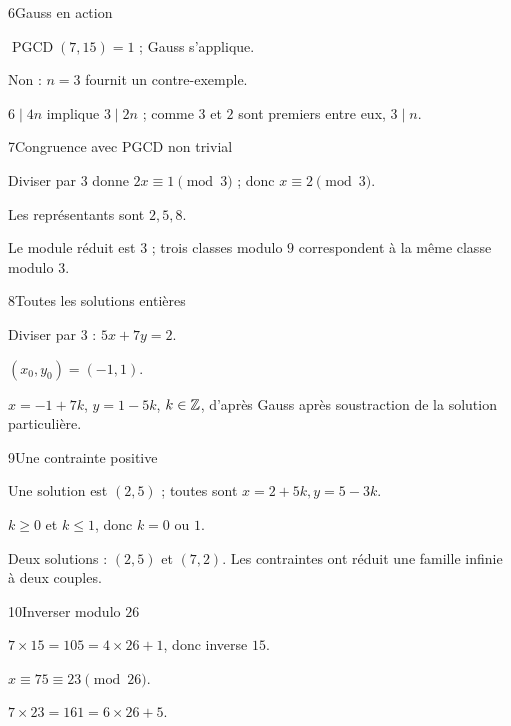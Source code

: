 \begin{corrige}{6}{Gauss en action}
\begin{questions}
\item $\operatorname{PGCD}(7,15)=1$ ; Gauss s’applique.
\item Non : $n=3$ fournit un contre-exemple.
\item $6\mid4n$ implique $3\mid2n$ ; comme $3$ et $2$ sont premiers entre eux, $3\mid n$.
\end{questions}
\end{corrige}
\begin{corrige}{7}{Congruence avec PGCD non trivial}
\begin{questions}
\item Diviser par $3$ donne $2x\equiv1\pmod3$ ; donc $x\equiv2\pmod3$.
\item Les représentants sont $2,5,8$.
\item Le module réduit est $3$ ; trois classes modulo $9$ correspondent à la même classe modulo $3$.
\end{questions}
\end{corrige}
\begin{corrige}{8}{Toutes les solutions entières}
\begin{questions}
\item Diviser par $3$ : $5x+7y=2$.
\item $(x_0,y_0)=(-1,1)$.
\item $x=-1+7k$, $y=1-5k$, $k\in\mathbb{Z}$, d’après Gauss après soustraction de la solution particulière.
\end{questions}
\end{corrige}
\begin{corrige}{9}{Une contrainte positive}
\begin{questions}
\item Une solution est $(2,5)$ ; toutes sont $x=2+5k,y=5-3k$.
\item $k\geq0$ et $k\leq1$, donc $k=0$ ou $1$.
\item Deux solutions : $(2,5)$ et $(7,2)$. Les contraintes ont réduit une famille infinie à deux couples.
\end{questions}
\end{corrige}
\begin{corrige}{10}{Inverser modulo $26$}
\begin{questions}
\item $7\times15=105=4\times26+1$, donc inverse $15$.
\item $x\equiv75\equiv23\pmod{26}$.
\item $7\times23=161=6\times26+5$.
\end{questions}
\end{corrige}
